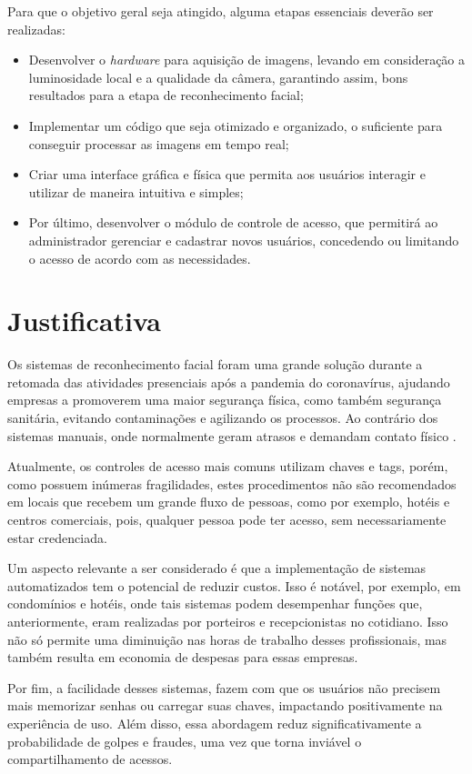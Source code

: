 Para que o objetivo geral seja atingido, alguma etapas essenciais deverão 
ser realizadas:

\begin{itemize}
    \item  Desenvolver o \textit{hardware} para aquisição de imagens, levando em 
    consideração a luminosidade local e a qualidade da câmera, garantindo assim, 
    bons resultados para a etapa de reconhecimento facial;
  
    \item Implementar um código que seja otimizado e organizado, o suficiente para 
    conseguir processar as imagens em tempo real; 
    
    \item Criar uma interface gráfica e física que permita aos usuários interagir 
    e utilizar de maneira intuitiva e simples;
    
    \item Por último, desenvolver o módulo de controle de acesso, que permitirá 
    ao administrador gerenciar e cadastrar novos usuários, concedendo ou 
    limitando o acesso de acordo com as necessidades.
\end{itemize}

\section{Justificativa}\label{sec:justificativa}

Os sistemas de reconhecimento facial foram uma grande solução durante a retomada 
das atividades presenciais após a pandemia do coronavírus, ajudando empresas
a promoverem uma maior segurança física, como também segurança sanitária, 
evitando contaminações e agilizando os processos. Ao contrário dos sistemas 
manuais, onde normalmente geram atrasos e demandam contato físico \cite{terra2020}.

Atualmente, os controles de acesso mais comuns utilizam chaves 
e tags, porém, como possuem inúmeras fragilidades, estes procedimentos não são 
recomendados em locais que recebem um grande fluxo de pessoas, como por exemplo, 
hotéis e centros comerciais, pois, qualquer pessoa pode ter acesso, 
sem necessariamente estar credenciada.

Um aspecto relevante a ser considerado é que a implementação de sistemas 
automatizados tem o potencial de reduzir custos. Isso é notável, por 
exemplo, em condomínios e hotéis, onde tais sistemas podem desempenhar 
funções que, anteriormente, eram realizadas por porteiros e recepcionistas 
no cotidiano. Isso não só permite uma diminuição nas horas de trabalho 
desses profissionais, mas também resulta em economia de despesas para 
essas empresas.

Por fim, a facilidade desses sistemas, fazem com que os usuários não precisem 
mais memorizar senhas ou carregar suas chaves, impactando positivamente na 
experiência de uso. Além disso, essa abordagem reduz significativamente a 
probabilidade de golpes e fraudes, uma vez que torna inviável o 
compartilhamento de acessos.
